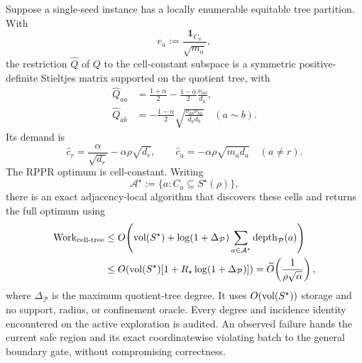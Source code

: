 \begin{theorem}
\label{thm:equitable-tree-quotient}
Suppose a single-seed instance has a locally enumerable equitable tree
partition.  With
\begin{equation}
 e_a:=\frac{\mathbf 1_{C_a}}{\sqrt{m_a}},
 \label{eq:equitable-cell-basis}
\end{equation}
the restriction $\widehat Q$ of $Q$ to the cell-constant subspace is a
symmetric positive-definite Stieltjes matrix supported on the quotient tree,
with
\begin{align}
 \widehat Q_{aa}
 &=\frac{1+\alpha}{2}
   -\frac{1-\alpha}{2}\frac{\nu_{aa}}{d_a},
 \label{eq:equitable-tree-quotient-diagonal}\\
 \widehat Q_{ab}
 &=-\frac{1-\alpha}{2}
   \sqrt{\frac{\nu_{ab}\nu_{ba}}{d_ad_b}}
 \quad(a\sim b).
 \label{eq:equitable-tree-quotient-edge}
\end{align}
Its demand is
\begin{equation}
 \widehat c_r
 =\frac{\alpha}{\sqrt{d_r}}-\alpha\rho\sqrt{d_r},
 \qquad
 \widehat c_a=-\alpha\rho\sqrt{m_ad_a}
 \quad(a\neq r).
 \label{eq:equitable-tree-quotient-demand}
\end{equation}
The RPPR optimum is cell-constant.  Writing
\begin{equation*}
 \mathcal A^\star:=\{a:C_a\subseteq S^\star(\rho)\},
\end{equation*}
there is an exact adjacency-local algorithm that discovers these cells and
returns the full optimum using
\begin{align}
 \operatorname{Work}_{\rm cell\text{-}tree}
 &\leq
 O\!\left(
  \operatorname{vol}(S^\star)
  +\log(1+\Delta_{\mathcal P})
   \sum_{a\in\mathcal A^\star}
   \operatorname{depth}_{\mathcal P}(a)
 \right)
 \notag\\
 &\leq
 O\!\left(
  \operatorname{vol}(S^\star)
  [1+R_\star\log(1+\Delta_{\mathcal P})]
 \right)
 =\widetilde O\!\left(\frac1{\rho\sqrt\alpha}\right),
 \label{eq:equitable-tree-quotient-work}
\end{align}
where $\Delta_{\mathcal P}$ is the maximum quotient-tree degree.  It uses
$O(\operatorname{vol}(S^\star))$ storage and no support, radius, or confinement oracle.
Every degree and incidence identity encountered on the active exploration is
audited.  An observed failure hands the current safe region and its exact
coordinatewise violating batch to the general boundary gate, without
compromising correctness.
\end{theorem}

